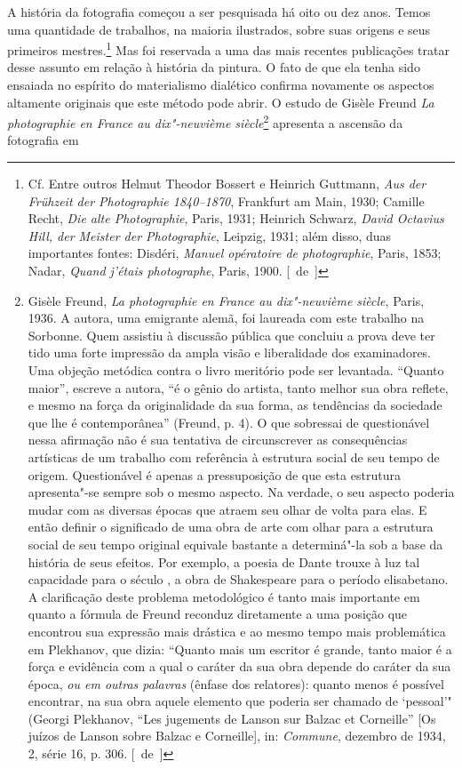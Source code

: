 A história da fotografia começou a ser pesquisada há oito ou dez anos.
Temos uma quantidade de trabalhos, na maioria ilustrados, sobre suas
origens e seus primeiros mestres.\footnote{Cf. Entre outros Helmut
  Theodor Bossert e Heinrich Guttmann, \emph{Aus der Frühzeit der
  Photographie 1840--1870}, Frankfurt am Main, 1930; Camille Recht,
  \emph{Die alte Photographie}, Paris, 1931; Heinrich Schwarz,
  \emph{David Octavius Hill, der Meister der Photographie}, Leipzig,
  1931; além disso, duas importantes fontes: Disdéri, \emph{Manuel
  opératoire de photographie}, Paris, 1853; Nadar, \emph{Quand
  j'étais photographe}, Paris, 1900. [~de~]} Mas foi reservada a uma das mais recentes
publicações tratar desse assunto em relação à história da
pintura. O fato de que ela tenha sido ensaiada no espírito do materialismo
dialético confirma novamente os aspectos altamente
originais que este método pode abrir. O estudo de Gisèle Freund \emph{La
photographie en France au dix"-neuvième siècle}\footnote{Gisèle Freund,
  \emph{La photographie en France au dix"-neuvième siècle}, Paris, 1936. A
  autora, uma emigrante alemã, foi laureada com este trabalho na
  Sorbonne. Quem assistiu à discussão pública que concluiu a prova deve
  ter tido uma forte impressão da ampla visão e liberalidade dos
  examinadores. Uma objeção metódica contra o livro meritório pode ser
  levantada. ``Quanto maior'', escreve a autora, ``é o gênio do artista,
  tanto melhor sua obra reflete, e mesmo na força da originalidade da
  sua forma, as tendências da sociedade que lhe é contemporânea''
  (Freund, p. 4). O que sobressai de questionável nessa afirmação não é
  sua tentativa de circunscrever as consequências artísticas de um
  trabalho com referência à estrutura social de seu tempo de origem.
  Questionável é apenas a pressuposição de que esta estrutura
  apresenta"-se sempre sob o mesmo aspecto. Na verdade, o seu aspecto
  poderia mudar com as diversas épocas que atraem seu olhar de volta
  para elas. E então definir o significado de uma obra de arte com olhar
  para a estrutura social de seu tempo original equivale bastante a
  determiná"-la sob a base da história de seus efeitos. Por exemplo, a
  poesia de Dante trouxe à luz tal capacidade para o século , a obra
  de Shakespeare para o período elisabetano. A clarificação deste
  problema metodológico é tanto mais importante em quanto a fórmula de
  Freund reconduz diretamente a uma posição que encontrou sua
  expressão mais drástica e ao mesmo tempo mais problemática em
  Plekhanov, que dizia: ``Quanto mais um escritor é grande, tanto maior é
  a força e evidência com a qual o caráter da sua obra depende do
  caráter da sua época, \emph{ou em outras palavras} (ênfase dos
  relatores): quanto menos é possível encontrar, na sua obra aquele
  elemento que poderia ser chamado de `pessoal'" (Georgi Plekhanov,
  ``Les jugements de Lanson sur Balzac et Corneille'' {[}Os juízos de
  Lanson sobre Balzac e Corneille{]}, in: \emph{Commune}, dezembro de
  1934, 2, série 16, p. 306. [~de~]} apresenta a ascensão da fotografia em
